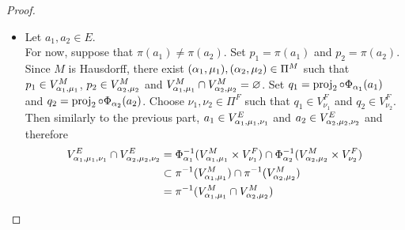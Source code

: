 \documentclass{book}
\begin{document}
\begin{proof}
\begin{enumerate}
\begin{itemize}
				Let $a \in E$. Set $p = \pi(a)$. Choose $(\al, \mu) \in S^M$ such that $p \in V_{\al, \mu}^M$. Since $V^M_{\al, \mu} \subset U_{\al}$, $a \in E_{U_{\al}}$ which implies that
				\begin{align*}
					p
					& = \pi(a) \\
					& = \prj_1 \circ \Phi_{\al}(a)
				\end{align*}
				Set $q = \prj_2 \circ \Phi_{\al}(a)$. Choose $\nu \in S^F$ such that $q \in V^F_{\nu}$. Then 
				\begin{align*}
					\Phi_{\al}(a)
					& = (\prj_1 \circ \Phi_{\al}(a), \prj_2 \circ \Phi_{\al}(a)) \\
					& = (p, q) \\
					& \in V_{\al, \mu}^M \times V_{\nu}^F
				\end{align*}
				Thus 
				\begin{align*}
					a 
					& \in \Phi^{-1}_{\al}(V_{\al, \mu}^M \times V_{\nu}^F) \\
					& = V^E_{\al, \mu, \nu} 
				\end{align*}
				Since $a \in E$ is arbitrary, we have that for each $a \in E$, there exists $(\al, \mu, \nu) \in S^M \times S^F \subset \Pi^E$ such that $a \in V^E_{\al, \mu, \nu}$. Thus 
				$$E \subset \bigcup_{(\al, \mu, \nu) \in S^M \times S^F} V_{\al, \mu, \nu}$$
				\item Let $a_1, a_2 \in E$. \\
				For now, suppose that $\pi(a_1) \neq \pi(a_2)$. Set $p_1 = \pi(a_1)$ and $p_2 = \pi(a_2)$. Since $M$ is Hausdorff, there exist $(\alpha_1, \mu_1), (\alpha_2, \mu_2) \in \Pi^M$ such that $p_1 \in V^M_{\alpha_1, \mu_1}$, $p_2 \in V^M_{\alpha_2, \mu_2}$ and $V^M_{\alpha_1, \mu_1} \cap V^M_{\alpha_2, \mu_2} = \varnothing$. Set $q_1 = \operatorname{\text{proj}}_2 \circ \Phi_{\alpha_1}(a_1)$ and  $q_2 = \operatorname{\text{proj}}_2 \circ \Phi_{\alpha_2}(a_2)$. Choose $\nu_1, \nu_2 \in \Pi^F$ such that $q_1 \in V^F_{\nu_1}$ and $q_2 \in V^F_{\nu_2}$. Then similarly to the previous part, $a_1 \in V^E_{\alpha_1, \mu_1, \nu_1}$ and $a_2 \in V^E_{\alpha_2, \mu_2, \nu_2}$ and therefore
				\begin{align*}
					V^E_{\al_1, \mu_1, \nu_1} \cap V^E_{\al_2, \mu_2, \nu_2}
					& = \Phi_{\al_1}^{-1}(V^M_{\al_1, \mu_1} \times V^F_{\nu_1}) \cap \Phi_{\al_2}^{-1}(V^M_{\al_2, \mu_2} \times V^F_{\nu_2}) \\
					& \subset \pi^{-1}(V^M_{\al_1, \mu_1}) \cap \pi^{-1}(V^M_{\al_2, \mu_2}) \\
					& = \pi^{-1}(V^M_{\al_1, \mu_1} \cap V^M_{\al_2, \mu_2}) \\

\end{align*}
\end{itemize}
\end{enumerate}
\end{proof}
\end{document}
